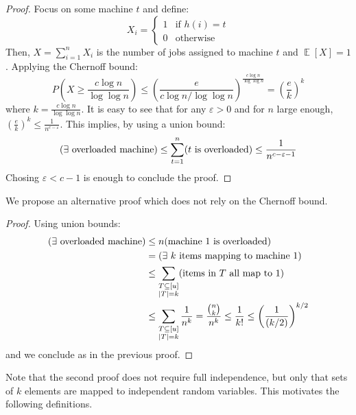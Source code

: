 \documentclass[11pt]{article}
\DeclareMathOperator*{\E}{\mathbb{E}}
\let\Pr\relax
\DeclareMathOperator*{\Pr}{\mathbb{P}}
\newcommand{\eps}{\varepsilon}
\theoremstyle{definition}
\begin{document}
\begin{proof}
    Focus on some machine $t$ and define:
    \begin{displaymath}
        X_i= \begin{cases}
            1 &\text{if $h(i) = t$}\\
            0&\text{otherwise}
        \end{cases}
    \end{displaymath}
    Then, $X=\sum_{i=1}^n X_i$ is the number of jobs assigned to machine $t$
    and $\E[X]=1$. Applying the Chernoff bound:
    \begin{displaymath}
        P\left(X\geq \frac{c\log n}{\log \log n}\right) \leq
    \left(\frac{e}{c\log n/\log\log n}\right)^{\frac{c\log
    n}{\log\log n}} = \left(\frac{e}{k}\right)^k
    \end{displaymath}
    where $k=\frac{c\log n}{\log \log n}$. It is easy to see that for any
    $\eps>0$ and for $n$ large enough, $\left(\frac{e}{k}\right)^k \leq
    \frac{1}{n^{c-\eps}}$. This
    implies, by using a union bound:
    \begin{displaymath}
        \Pr(\exists\text{ overloaded machine})
        \leq \sum_{t=1}^n \Pr (t\text{ is overloaded})
        \leq \frac{1}{n^{c-\eps-1}}
    \end{displaymath}
    Chosing $\eps < c-1$ is enough to conclude the proof.
\end{proof}

We propose an alternative proof which does not rely on the Chernoff bound.

\begin{proof}
    Using union bounds:
    \begin{align*}
    \Pr(\exists\text{ overloaded machine})
    &\leq n \Pr(\text{machine 1 is overloaded})\\
    &=\Pr(\exists \text{ $k$ items mapping to machine 1})\\
    &\leq \sum_{\substack{T\subseteq[u]\\|T|=k}} \Pr (\text{items in $T$ all
    map to 1})\\
    &\leq\sum_{\substack{T\subseteq[u]\\|T|=k}} \frac{1}{n^k}
    = \frac{\binom{n}{k}}{n^k}\leq \frac{1}{k!}
    \leq\left(\frac{1}{(k/2)}\right)^{k/2}
\end{align*}
and we conclude as in the previous proof.
\end{proof}

Note that the second proof does not require full independence, but only that
sets of $k$ elements are mapped to independent random variables. This motivates
the following definitions.
\end{document}
